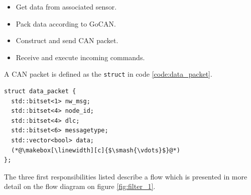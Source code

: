 \begin{itemize}
\item Get data from associated sensor.
\item Pack data according to GoCAN.
\item Construct and send CAN packet.
\item Receive and execute incoming commands.
\end{itemize}

A CAN packet is defined as the \texttt{struct} in code \ref{code:data_packet}.
\begin{lstlisting}[caption=Struct for data packet.,label=code:data_packet]
struct data_packet {
  std::bitset<1> nw_msg;
  std::bitset<4> node_id;
  std::bitset<4> dlc;
  std::bitset<6> messagetype;
  std::vector<bool> data; 
  (*@\makebox[\linewidth][c]{$\smash{\vdots}$}@*)
};
\end{lstlisting}

The three first responsibilities listed describe a flow which is presented in more detail on the flow diagram on figure \ref{fig:filter_1}.

